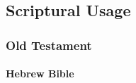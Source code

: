 
\subsection{Scriptural Usage} %
	\label{TEMPLE-SCRIPTURES}
	

	\subsubsection{Old Testament} %
		\label{TEMPLE-OT}
	
	
			
			
		\paragraph{Hebrew Bible}
			\label{TEMPLE-HEBREW}
		
			\subparagraph{\texorpdfstring{}{}} %
				\label{HAR} %
			
